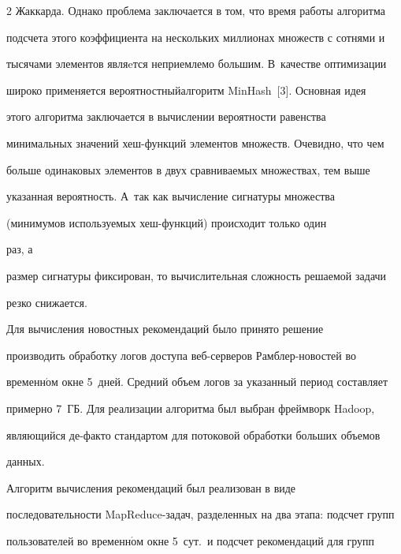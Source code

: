 \begin{multicols}{2}
Жаккарда. Однако проблема заключается в том, что время работы алгоритма 


подсчета этого коэффициента на нескольких миллионах множеств с сотнями и 


тысячами элементов являeтся неприемлемо большим. В~качестве оптимизации 


широко применяется вероятностный\linebreak алгоритм MinHash~[3]. Основная идея 


этого алгоритма заключается в вычислении вероятности равенства 


минимальных значений хеш-функ\-ций элементов множеств. Очевидно, что чем 


больше одинако\-вых элементов в двух срав\-ни\-ва\-емых множествах, тем выше 


указанная вероятность. А~так как вычисление сигнатуры множества 


(минимумов используемых хеш-функ\-ций) происходит только один


 раз, а 


размер сигнатуры фиксирован, то вычислительная сложность решаемой задачи 


резко снижается.








   


   Для вычисления новостных рекомендаций было принято решение 


производить обработку логов доступа веб-сер\-ве\-ров Рамб\-лер-но\-во\-стей во 


временн$\acute{\mbox{о}}$м окне 5~дней. Средний объем логов за указанный период составляет 


примерно 7~ГБ. Для реализации алгоритма был выбран фреймворк Hadoop, 


являющийся де-фак\-то стандартом для потоковой обработки больших объемов 


данных.











   Алгоритм вычисления рекомендаций был реализован в виде 


последовательности MapReduce-за\-дач, разделенных на два этапа: подсчет групп 


пользователей во временн$\acute{\mbox{о}}$м окне 5~сут.\ и подсчет рекоменда\-ций для групп 



\end{multicols}
